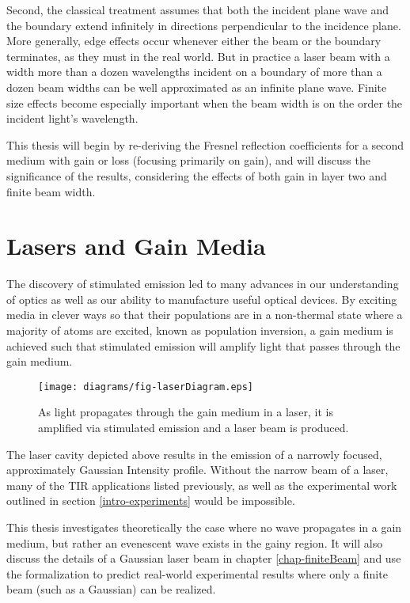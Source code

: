 \documentclass[12pt]{uthesis-v12}
\begin{document}
Second, the classical treatment assumes that both the incident plane wave and the boundary extend infinitely in directions perpendicular to the incidence plane.  More generally, edge effects  occur whenever either the beam or the boundary terminates, as they must in the real world. But in practice a laser beam with a width more than a dozen wavelengths incident on a boundary of more than a dozen beam widths can be well approximated as an infinite plane wave. Finite size effects become especially important when the beam width is on the order the incident light's wavelength.\cite{Konopsky}

This thesis will begin by re-deriving the Fresnel reflection coefficients for a second medium with gain or loss (focusing primarily on gain), and will discuss the significance of the results, considering the effects of both gain in layer two and finite beam width.

\section{Lasers and Gain Media}\label{intro-lasersAndGain}
The discovery of stimulated emission led to many advances in our understanding of optics as well as our ability to manufacture useful optical devices. By exciting media in clever ways so that their populations are in a non-thermal state where a majority of atoms are excited, known as population inversion, a gain medium is achieved such that stimulated emission will amplify light that passes through the gain medium.

\begin{figure}[ht]
 \centering
 \texttt{[image: diagrams/fig-laserDiagram.eps]}
 \caption[Internal structure of a laser.]
         {As light propagates through the gain medium in a laser, it is amplified via stimulated emission and a laser beam is produced.
 \label{fig-laserDiagram}}
\end{figure}

The laser cavity depicted above results in the emission of a narrowly focused, approximately Gaussian Intensity profile. Without the narrow beam of a laser, many of the TIR applications listed previously, as well as the experimental work outlined in section \ref{intro-experiments} would be impossible.

This thesis investigates theoretically the case where no wave propagates in a gain medium, but rather an evenescent wave exists in the gainy region.  It will also discuss the details of a Gaussian laser beam in chapter \ref{chap-finiteBeam} and use the formalization to predict real-world experimental results where only a finite beam (such as a Gaussian) can be realized.
\end{document}
